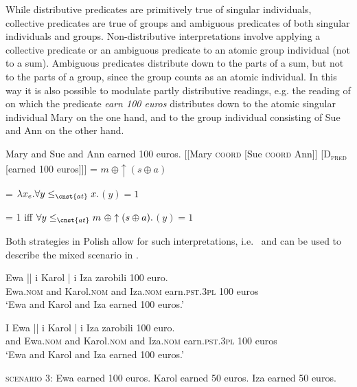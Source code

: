 \documentclass[output=paper]{langscibook}
\begin{document}
\noindent While distributive predicates are primitively true of singular individuals, collective predicates are true of groups and ambiguous predicates of both singular individuals and groups. Non-distributive  interpretations involve applying a collective predicate or an ambiguous predicate to an atomic group individual (not to a sum). Ambiguous predicates distribute down to the parts of a sum, but not to the parts of a group, since the group counts as an atomic individual. In this way it is also possible to modulate partly distributive readings, e.g. the reading of  on which the predicate \textit{earn 100 euros} distributes down to the atomic singular individual Mary on the one hand, and to the group individual consisting of Sue and Ann on the other hand. 

\ea
\ea\label{ros:inter} Mary and Sue and Ann earned 100 euros.
\ex\label{ros:land-d} [[Mary \textsc{coord} [Sue \textsc{coord} Ann]] [\textsc{D\textsubscript{pred}} [earned 100 euros]]] 
\ex \sib{Mary \textsc{coord} $\uparrow$ [Sue \textsc{coord} Ann]]} = $m\ \oplus \uparrow(s \oplus a)$

\ex {} = $\lambda x_{e}. \forall y \le_{\cnst{at}} x.$$(y) = 1$

\ex {} = 1 iff $\forall y \le_{\cnst{at}} m\ \oplus \uparrow(s \oplus a).$$(y) = 1$
\z\z

\noindent Both strategies in Polish allow for such interpretations, i.e.~ and  can be used to describe the mixed scenario in .

\ea
\ea\label{ros:un-part} \gll Ewa || i Karol | i Iza zarobili 100 euro. \\
Ewa.\textsc{nom} {} and Karol.\textsc{nom} {} and Iza.\textsc{nom} earn.\textsc{pst.3pl} 100 euros \\
\glt `Ewa and Karol and Iza earned 100 euros.' 

\ex\label{ros:mark-part} \gll I Ewa || i Karol | i Iza zarobili 100 euro. \\
and Ewa.\textsc{nom} {} and Karol.\textsc{nom} {} and Iza.\textsc{nom} earn.\textsc{pst.3pl} 100 euros \\
\glt `Ewa and Karol and Iza earned 100 euros.' 
\z\z

\ea\label{ros:sc3}
\textsc{scenario 3}: Ewa earned 100 euros. Karol earned 50 euros. Iza earned 50 euros.
\z
\end{document}

